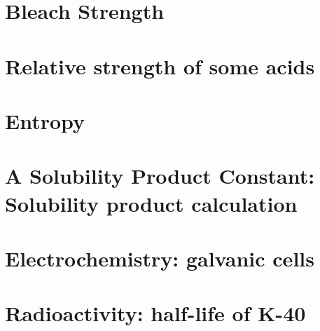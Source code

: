 \documentclass{book}
\newcommand\labname{}\newcommand\texbooklabel{}\newcommand\pathtofiles{}
\begin{document}
  \newpage  \section{Bleach Strength}
 \newpage\section{Relative strength of some acids}
  \newpage \section{Entropy}
   \newpage  \section{A Solubility Product Constant: Solubility product calculation}
   \clearpage\mbox{}\clearpage \section{Electrochemistry: galvanic cells}
  
    
    \renewcommand\labname{../\texbooklabel/LAB-nuclear}\renewcommand\texbooklabel{Ch-nuclear}\renewcommand\pathtofiles{../\texbooklabel/}
     \section{Radioactivity: half-life of K-40}
\end{document}
